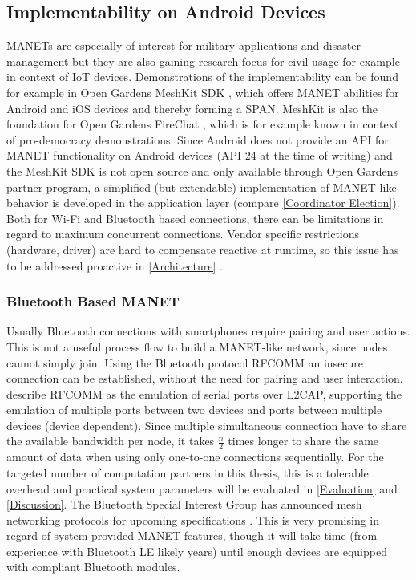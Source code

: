 	\subsection{Implementability on Android Devices} \label{Implementability}
	
	\glspl{MANET} are especially of interest for military applications and disaster management but they are also gaining research focus for civil usage for example in context of \gls{IoT} devices. Demonstrations of the implementability can be found for example in Open Gardens MeshKit \gls{SDK} \autocite{Online:MeshKit}, which offers \gls{MANET} abilities for Android and iOS devices and thereby forming a \gls{SPAN}. MeshKit is also the foundation for Open Gardens FireChat \autocite{Online:FireChat}, which is for example known in context of pro-democracy demonstrations. Since Android does not provide an \gls{API} for \gls{MANET} functionality on Android devices (\gls{API} 24 at the time of writing) and the MeshKit \gls{SDK} is not open source and only available through Open Gardens partner program, a simplified (but extendable) implementation of \gls{MANET}-like behavior is developed in the application layer (compare \ref{Coordinator Election}).
	Both for Wi-Fi and Bluetooth based connections, there can be limitations in regard to maximum concurrent connections. Vendor specific restrictions (hardware, driver) are hard to compensate reactive at runtime, so this issue has to be addressed proactive in \ref{Architecture} .
	
	\subsubsection{Bluetooth Based \gls{MANET}}
	
	Usually Bluetooth connections with smartphones require pairing and user actions. This is not a useful process flow to build a \gls{MANET}-like network, since nodes cannot simply join.
	Using the Bluetooth protocol \gls{RFCOMM} an insecure connection can be established, without the need for pairing and user interaction. \textcite{RFCOMM2012} describe \gls{RFCOMM} as the emulation of serial ports over \gls{L2CAP}, supporting the emulation of multiple ports between two devices and ports between multiple devices (device dependent).
	Since multiple simultaneous connection have to share the available bandwidth per node, it takes $\frac{n}{2}$ times longer to share the same amount of data when using only one-to-one connections sequentially. For the targeted number of computation partners in this thesis, this is a tolerable overhead and practical system parameters will be evaluated in \ref{Evaluation} and \ref{Discussion}.
	The Bluetooth Special Interest Group has announced mesh networking protocols for upcoming specifications \autocite{Online:BluetoothMesh}. This is very promising in regard of system provided \gls{MANET} features, though it will take time (from experience with Bluetooth LE likely years) until enough devices are equipped with compliant Bluetooth modules.

